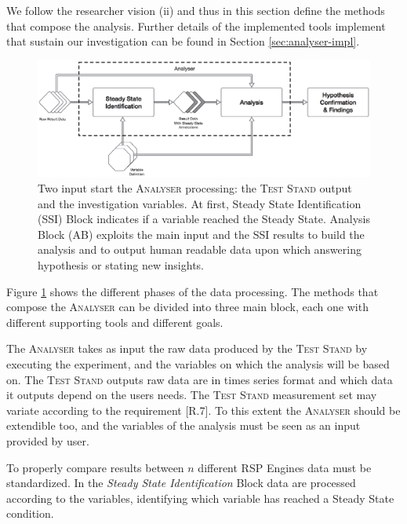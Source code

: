 We follow the researcher vision (ii) and thus in this section define the methods that compose the analysis. Further details of the implemented tools implement that sustain our investigation can be found in Section \ref{sec:analyser-impl}.

\begin{figure}[tbh]
  \centering
	\includegraphics[width=\linewidth]{images/analyser-block-schema}
	\caption[\textsc{Analyser} Block Schema - Design Detail Level]{Two input start the \textsc{Analyser} processing: the \textsc{Test Stand} output and the investigation variables. At first, Steady State Identification (SSI) Block indicates if a variable reached the Steady State. Analysis Block (AB) exploits the main input and the SSI results to build the analysis and to output human readable data upon which answering hypothesis or stating new insights.}
  	\label{fig:analyser-block-schema}
\end{figure}

Figure \ref{fig:analyser-block-schema} shows the different phases of the data processing. The methods that compose the \textsc{Analyser} can be divided into three main block, each one with different supporting tools and different goals.

The \textsc{Analyser} takes as input the raw data produced by the \textsc{Test Stand} by executing the experiment, and the variables on which the analysis will be based on. The \textsc{Test Stand} outputs raw data are in times series format and which data it outputs depend on the users needs. The \textsc{Test Stand} measurement set may variate according to the requirement [R.7]. To this extent the \textsc{Analyser} should be extendible too, and the variables of the analysis must be seen as an input provided by \name user.

To properly compare results between $n$ different RSP Engines data must be standardized. In the \textit{Steady State Identification} Block data are processed according to the variables, identifying which variable has reached a Steady State condition.

